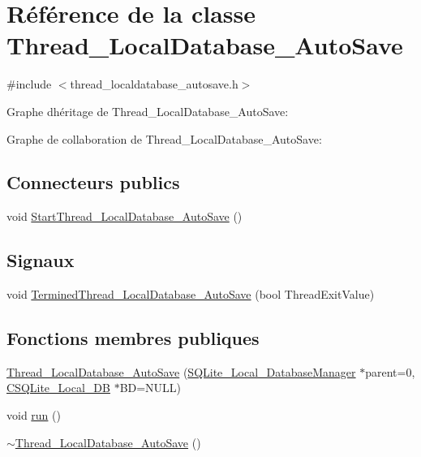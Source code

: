 \hypertarget{class_thread___local_database___auto_save}{}\section{Référence de la classe Thread\+\_\+\+Local\+Database\+\_\+\+Auto\+Save}
\label{class_thread___local_database___auto_save}


{\ttfamily \#include $<$thread\+\_\+localdatabase\+\_\+autosave.\+h$>$}



Graphe d\textquotesingle{}héritage de Thread\+\_\+\+Local\+Database\+\_\+\+Auto\+Save\+:


Graphe de collaboration de Thread\+\_\+\+Local\+Database\+\_\+\+Auto\+Save\+:
\subsection*{Connecteurs publics}
\begin{DoxyCompactItemize}
\item 
void \hyperlink{class_thread___local_database___auto_save_a85303c66b12dd217303f045a1111408a}{Start\+Thread\+\_\+\+Local\+Database\+\_\+\+Auto\+Save} ()
\end{DoxyCompactItemize}
\subsection*{Signaux}
\begin{DoxyCompactItemize}
\item 
void \hyperlink{class_thread___local_database___auto_save_acd2bdaf259fc6edaab2788cac95637bd}{Termined\+Thread\+\_\+\+Local\+Database\+\_\+\+Auto\+Save} (bool Thread\+Exit\+Value)
\end{DoxyCompactItemize}
\subsection*{Fonctions membres publiques}
\begin{DoxyCompactItemize}
\item 
\hyperlink{class_thread___local_database___auto_save_a6c0682c8574f353706cf47f7c8d2e9f5}{Thread\+\_\+\+Local\+Database\+\_\+\+Auto\+Save} (\hyperlink{class_s_q_lite___local___database_manager}{S\+Q\+Lite\+\_\+\+Local\+\_\+\+Database\+Manager} $\ast$parent=0, \hyperlink{class_c_s_q_lite___local___d_b}{C\+S\+Q\+Lite\+\_\+\+Local\+\_\+\+D\+B} $\ast$B\+D=N\+U\+L\+L)
\item 
void \hyperlink{class_thread___local_database___auto_save_a94a5bf2508b21c19f3cc06b3cbf0bcb3}{run} ()
\item 
\hyperlink{class_thread___local_database___auto_save_aec189c4b3cb32a0e579d01f07b7f9d2a}{$\sim$\+Thread\+\_\+\+Local\+Database\+\_\+\+Auto\+Save} ()
\end{DoxyCompactItemize}


